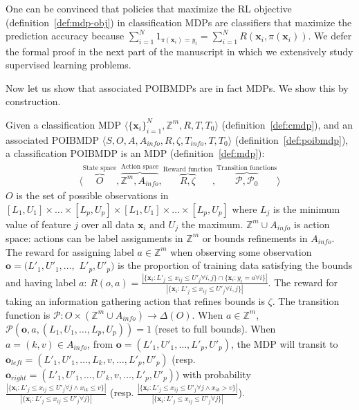 One can be convinced that policies that maximize the RL objective (definition~\ref{def:mdp-obj}) in classification MDPs are classifiers that maximize the prediction accuracy because $\sum_{i=1}^N 1_{\pi(\boldsymbol{x}_i)=y_i} = \sum_{i=1}^N R(\boldsymbol{x}_i, \pi(\boldsymbol{x}_i))$.
We defer the formal proof in the next part of the manuscript in which we extensively study supervised learning problems.


Now let us show that associated POIBMDPs are in fact MDPs. We show this by construction.

\begin{definition}\label{def:cpoibmdp}
    Given a classification MDP $\langle {\{\boldsymbol{x}_i\}}_{i=1}^N, \mathbb{Z}^m, R, T, T_0 \rangle$ (definition~\ref{def:cmdp}), and an associated POIBMDP $\langle S, O, A, A_{info}, R, \zeta, T_{info}, T, T_0\rangle$ (definition~\ref{def:poibmdp}), a classification POIBMDP is an MDP (definition~\ref{def:mdp}):
    \begin{align*}
        \langle \overbrace{O}^{\text{State space}}, \overbrace{\mathbb{Z}^m, A_{info}}^{\text{Action space}}, \overbrace{R, \zeta}^{\text{Reward function}}, \overbrace{\mathcal{P}, \mathcal{P}_0}^{\text{Transition functions}} \rangle
    \end{align*}
    $O$ is the set of possible observations in $[L_1, U_1] \times \dots \times [L_p, U_p] \times [L_1, U_1] \times \dots \times [L_p, U_p] $ where $L_j$ is the minimum value of feature $j$ over all data $\boldsymbol{x}_i$ and $U_j$ the maximum.
    $\mathbb{Z}^m \cup A_{info}$ is action space: actions can be label assignments in $\mathbb{Z}^m$ or bounds refinements in $A_{info}$.
    The reward for assigning label $a\in \mathbb{Z}^m$ when observing some observation $\boldsymbol{o}=(L'_1, U'_1, \dots,$ $L'_p, U'_p)$ is the proportion of training data satisfying the bounds and having label $a$: $R(o, a) = \frac{|\{\boldsymbol{x}_i: L'_j \leq x_{ij} \leq U'_j \forall i,j \} \cap \{\boldsymbol{x}_i: y_i = a \forall i \}|}{|\{\boldsymbol{x}_i: L'_j \leq x_{ij} \leq U'_j \forall i,j \}|}$. 
    The reward for taking an information gathering action that refines bounds is $\zeta$.
    The transition function is $\mathcal{P}:O \times (\mathbb{Z}^m \cup A_{info}) \rightarrow \Delta (O)$. When $a \in \mathbb{Z}^m$, $\mathcal{P}(\boldsymbol{o}, a, (L_1, U_1, \dots, L_p, U_p)) = 1$ (reset to full bounds).
    When $a = (k, v) \in A_{info}$, from $\boldsymbol{o}=(L'_1, U'_1, \dots, L'_p, U'_p)$, the MDP will transit to $\boldsymbol{o}_{left} = (L'_1, U'_1, \dots, L_k, v, \dots, L'_p, U'_p)$ (resp. $\boldsymbol{o}_{right} = (L'_1, U'_1, \dots, U'_k, v, \dots, L'_p, U'_p)$) with probability $\frac{|\{\boldsymbol{x}_i: L'_j \leq x_{ij} \leq U'_j \forall j \land x_{ik} \leq v\}|}{|\{\boldsymbol{x}_i: L'_j \leq x_{ij} \leq U'_j \forall j\}|}$ (resp. $\frac{|\{\boldsymbol{x}_i: L'_j \leq x_{ij} \leq U'_j \forall j \land x_{ik} > v\}|}{|\{\boldsymbol{x}_i: L'_j \leq x_{ij} \leq U'_j \forall j\}|}$).
\end{definition}

